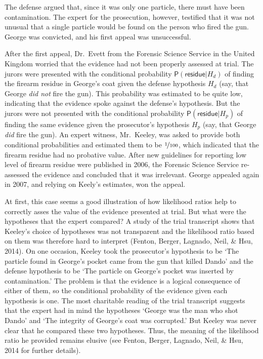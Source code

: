 \documentclass[
  10pt,
  dvipsnames,enabledeprecatedfontcommands]{scrartcl}
\newcommand{\pr}[1]{\mathsf{P}(#1)}
\begin{document}
\noindent  The defense argued that, since it was only one particle,
there must have been contamination. The expert for the prosecution,
however, testified that it was not unusual that a single particle would
be found on the person who fired the gun. George was convicted, and his
first appeal was unsuccessful.

After the first appeal, Dr.~Evett from the Forensic Science Service in
the United Kingdom worried that the evidence had not been properly
assessed at trial. The jurors were presented with the conditional
probability \(\pr{\textsf{residue}\vert H_d}\) of finding the firearm
residue in George's coat given the defense hypothesis \(H_d\) (say, that
George \textit{did not} fire the gun). This probability was estimated to
be quite low, indicating that the evidence spoke against the defense's
hypothesis. But the jurors were not presented with the conditional
probability \(\pr{\textsf{residue}\vert H_p}\) of finding the same
evidence given the prosecutor's hypothesis \(H_p\) (say, that George
\textit{did} fire the gun). An expert witness, Mr.~Keeley, was asked to
provide both conditional probabilities and estimated them to be
\(\nicefrac{1}{100}\), which indicated that the firearm residue had no
probative value. After new guidelines for reporting low level of firearm
residue were published in 2006, the Forensic Science Service re-assessed
the evidence and concluded that it was irrelevant. George appealed again
in 2007, and relying on Keely's estimates, won the appeal.

At first, this case seems a good illustration of how likelihood ratios
help to correctly asses the value of the evidence presented at trial.
But what were the hypotheses that the expert compared? A study of the
trial transcript shows that Keeley's choice of hypotheses was not
transparent and the likelihood ratio based on them was therefore hard to
interpret (Fenton, Berger, Lagnado, Neil, \& Hsu, 2014). On one
occasion, Keeley took the prosecutor's hypothesis to be `The particle
found in George's pocket came from the gun that killed Dando' and the
defense hypothesis to be `The particle on George's pocket was inserted
by contamination.' The problem is that the evidence is a logical
consequence of either of them, so the conditional probability of the
evidence given each hypothesis is one. The most charitable reading of
the trial transcript suggests that the expert had in mind the hypotheses
`George was the man who shot Dando' and `The integrity of George's coat
was corrupted.' But Keeley was never clear that he compared these two
hypotheses. Thus, the meaning of the likelihood ratio he provided
remains elusive (see Fenton, Berger, Lagnado, Neil, \& Hsu, 2014 for
further details).
\end{document}
